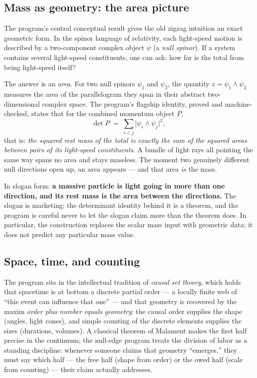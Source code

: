 \documentclass[11pt]{article}
\begin{document}
\subsection{Mass as geometry: the area picture}

The program's central conceptual result gives the old zigzag intuition an
exact geometric form.  In the spinor language of relativity, each
light-speed motion is described by a two-component complex object $\psi$
(a \emph{null spinor}).  If a system contains several light-speed
constituents, one can ask: how far is the total from being light-speed
itself?

The answer is an \emph{area}.  For two null spinors $\psi_1$ and $\psi_2$,
the quantity $z = \psi_1\wedge\psi_2$ measures the area of the
parallelogram they span in their abstract two-dimensional complex space.
The program's flagship identity, proved and machine-checked, states that
for the combined momentum object $P$,
\[
  \det P \;=\; \sum_{i<j} \lvert \psi_i \wedge \psi_j \rvert^2 ,
\]
that is: \emph{the squared rest mass of the total is exactly the sum of
the squared areas between pairs of its light-speed constituents}.  A
bundle of light rays all pointing the same way spans no area and stays
massless.  The moment two genuinely different null directions open up, an
area appears --- and that area \emph{is} the mass.

In slogan form: \textbf{a massive particle is light going in more than one
direction, and its rest mass is the area between the directions.}  The
slogan is marketing; the determinant identity behind it is a theorem, and
the program is careful never to let the slogan claim more than the theorem
does.  In particular, the construction replaces the scalar mass input with
geometric data; it does not predict any particular mass value.

\subsection{Space, time, and counting}

The program sits in the intellectual tradition of \emph{causal set
theory}, which holds that spacetime is at bottom a discrete partial order
--- a locally finite web of ``this event can influence that one'' ---
and that geometry is recovered by the maxim \emph{order plus number equals
geometry}: the causal order supplies the shape (angles, light cones), and
simple counting of the discrete elements supplies the sizes (durations,
volumes).  A classical theorem of Malament makes the first half precise in
the continuum; the null-edge program treats the division of labor as a
standing discipline: whenever someone claims that geometry ``emerges,''
they must say which half --- the free half (shape from order) or the owed
half (scale from counting) --- their claim actually addresses.
\end{document}
